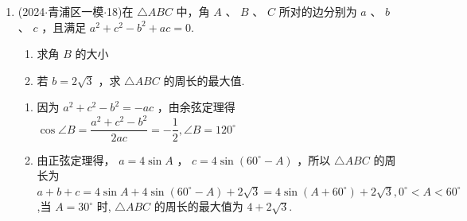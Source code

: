\begin{enumerate}
    \item (2024$\cdot$青浦区一模$\cdot$18)在 $\bigtriangleup {ABC}$ 中，角 $A$ 、 $B$ 、 $C$ 所对的边分别为 $a$ 、 $b$ 、 $c$ ，且满足 ${a}^{2} + {c}^{2} - {b}^{2} +  {ac} = 0.$
    \begin{enumerate}
        \item 求角 $B$ 的大小
        \item 若 $b = 2\sqrt{3}$ ，求 $\bigtriangleup  {ABC}$ 的周长的最大值.
    \end{enumerate}
    \begin{jieda}
        \begin{enumerate}
            \item 因为 ${a}^{2} + {c}^{2} - {b}^{2} =  - {ac}$ ，由余弦定理得 $\cos \angle B =  \dfrac{{a}^{2} + {c}^{2} - {b}^{2}}{2ac} =  - \dfrac{1}{2},\angle B = {120}^{ \circ  }$
            
            \item 由正弦定理得， $a = 4\sin A$ ， $c = 4\sin \left( {{60}^{ \circ  } - A}\right)$ ，所以 $\bigtriangleup {ABC}$ 的周长为 $a + b + c = 4\sin A + 4\sin \left( {{60}^{ \circ  } - A}\right)  + 2\sqrt{3} =  4\sin \left( {A + {60}^{ \circ  }}\right)  + 2\sqrt{3},{0}^{ \circ  } < A < {60}^{ \circ  }$ ,当 $A = {30}^{ \circ  }$ 时, $\bigtriangleup {ABC}$ 的周长的最大值为 $4 + 2\sqrt{3}$.
        \end{enumerate}
    \end{jieda}
\end{enumerate}
